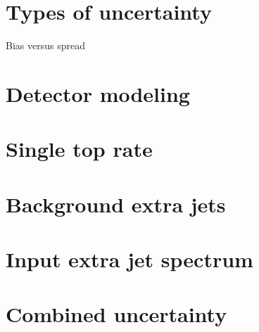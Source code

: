 \section{Types of uncertainty}
Bias versus spread
\section{Detector modeling}
\section{Single top rate}
\section{Background extra jets}
\section{Input extra jet spectrum}
\section{Combined uncertainty}